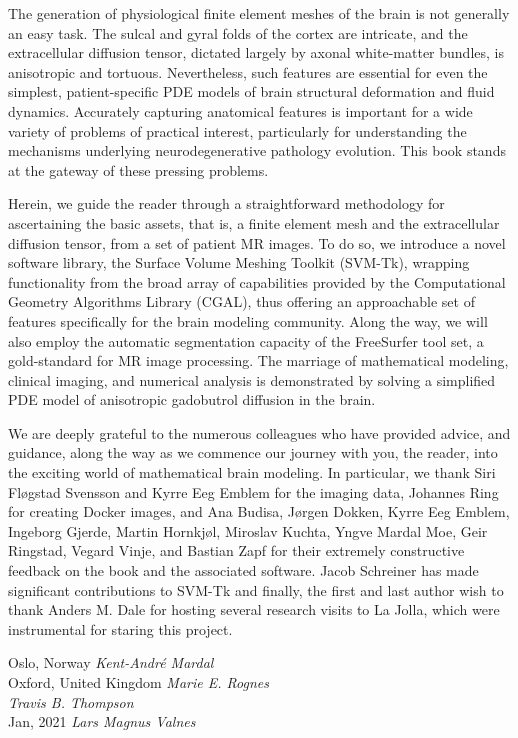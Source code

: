 The generation of physiological finite element meshes of the brain is
not generally an easy task. The sulcal and gyral folds of the cortex
are intricate, and the extracellular diffusion tensor, dictated
largely by axonal white-matter bundles, is anisotropic and
tortuous. Nevertheless, such features are essential for even the
simplest, patient-specific PDE models of brain structural deformation
and fluid dynamics. Accurately capturing anatomical features is
important for a wide variety of problems of practical interest,
particularly for understanding the mechanisms underlying
neurodegenerative pathology evolution. This book stands at the gateway
of these pressing problems.

Herein, we guide the reader through a straightforward methodology for
ascertaining the basic assets, that is, a finite element mesh and the
extracellular diffusion tensor, from a set of patient MR images. To do
so, we introduce a novel software library, the Surface Volume Meshing
Toolkit (SVM-Tk), wrapping functionality from the broad array of
capabilities provided by the Computational Geometry Algorithms Library
(CGAL), thus offering an approachable set of features specifically for
the brain modeling community. Along the way, we will also employ the
automatic segmentation capacity of the FreeSurfer tool set, a
gold-standard for MR image processing. The marriage of mathematical
modeling, clinical imaging, and numerical analysis is demonstrated by
solving a simplified PDE model of anisotropic gadobutrol diffusion in
the brain.

We are deeply grateful to the numerous colleagues who have provided
advice, and guidance, along the way as we commence our journey with
you, the reader, into the exciting world of mathematical brain
modeling. In particular, we thank Siri Fl\o gstad Svensson and Kyrre
Eeg Emblem for the imaging data, Johannes Ring for creating Docker
images, and Ana Budisa, J\o rgen Dokken, Kyrre Eeg Emblem, Ingeborg
Gjerde, Martin Hornkj\o l, Miroslav Kuchta, Yngve Mardal Moe, Geir
Ringstad, Vegard Vinje, and Bastian Zapf for their extremely
constructive feedback on the book and the associated software. 
Jacob Schreiner has made significant contributions to SVM-Tk and
finally, the first and last author wish to thank 
Anders M. Dale for hosting several research visits to La Jolla, 
which were instrumental for staring this project. 


\vspace{\baselineskip}
\begin{flushright}\noindent
Oslo, Norway \hfill {\it Kent-Andr\'e Mardal}\\ 
Oxford, United Kingdom   \hfill {\it Marie E. Rognes}\\ 
             \hfill {\it Travis B. Thompson}\\ 
Jan, 2021    \hfill {\it Lars Magnus Valnes}\\ 
\end{flushright}


